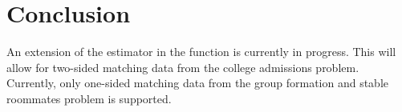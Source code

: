 \section{Conclusion} \label{Section:Conclusion}


An extension of the estimator in the  function is currently in progress. This will allow for two-sided matching data from the college admissions problem. Currently, only one-sided matching data from the group formation and stable roommates problem is supported.
